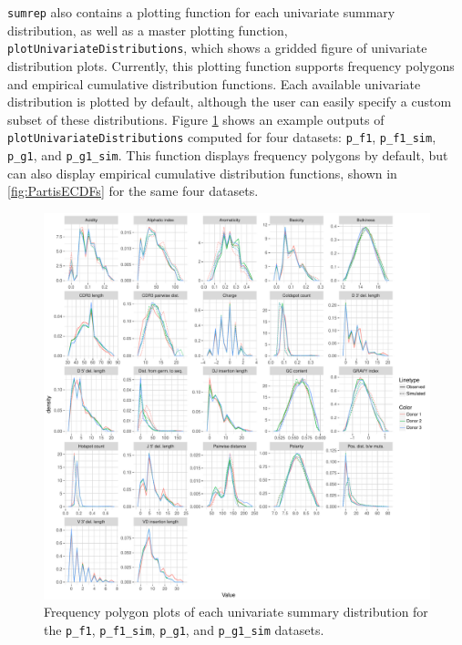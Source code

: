 \documentclass{article}
\begin{document}
\texttt{sumrep} also contains a plotting function for each univariate summary distribution, as well as a master plotting function, \texttt{plotUnivariateDistributions}, which shows a gridded figure of univariate distribution plots.
Currently, this plotting function supports frequency polygons and empirical cumulative distribution functions.
Each available univariate distribution is plotted by default, although the user can easily specify a custom subset of these distributions.
Figure \ref{fig:PartisFreqPolys} shows an example outputs of \texttt{plotUnivariateDistributions} computed for four datasets: \texttt{p\_f1}, \texttt{p\_f1\_sim}, \texttt{p\_g1}, and \texttt{p\_g1\_sim}.
This function displays frequency polygons by default, but can also display empirical cumulative distribution functions, shown in \ref{fig:PartisECDFs} for the same four datasets.
\begin{figure}
    \includegraphics[width=\linewidth]{Figures/PartisScores/partis_freqpoly.pdf}
    \caption{Frequency polygon plots of each univariate summary distribution for the \texttt{p\_f1}, \texttt{p\_f1\_sim}, \texttt{p\_g1}, and \texttt{p\_g1\_sim} datasets.}
    \label{fig:PartisFreqPolys}
\end{figure}
\end{document}
